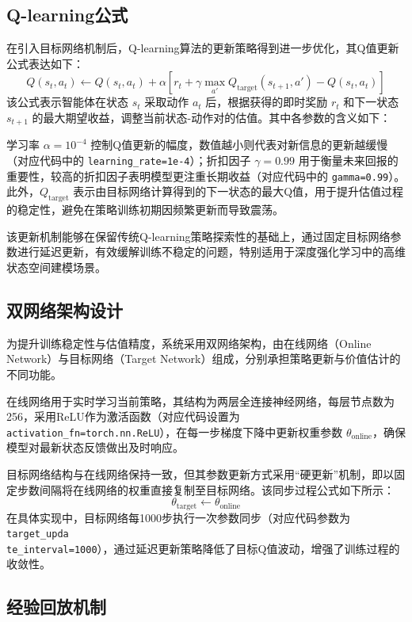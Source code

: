 \subsection{Q-learning公式}

在引入目标网络机制后，Q-learning算法的更新策略得到进一步优化，其Q值更新公式表达如下：
\[
Q(s_t,a_t) \leftarrow Q(s_t,a_t) + \alpha\left[r_t + \gamma \max_{a'}Q_{\text{target}}(s_{t+1},a') - Q(s_t,a_t)\right]
\]
该公式表示智能体在状态 $s_t$ 采取动作 $a_t$ 后，根据获得的即时奖励 $r_t$ 和下一状态 $s_{t+1}$ 的最大期望收益，调整当前状态-动作对的估值。其中各参数的含义如下：

学习率 $\alpha=10^{-4}$ 控制Q值更新的幅度，数值越小则代表对新信息的更新越缓慢（对应代码中的 \texttt{learning\_rate=1e-4}）；折扣因子 $\gamma=0.99$ 用于衡量未来回报的重要性，较高的折扣因子表明模型更注重长期收益（对应代码中的 \texttt{gamma=0.99}）。此外，$Q_{\text{target}}$ 表示由目标网络计算得到的下一状态的最大Q值，用于提升估值过程的稳定性，避免在策略训练初期因频繁更新而导致震荡。

该更新机制能够在保留传统Q-learning策略探索性的基础上，通过固定目标网络参数进行延迟更新，有效缓解训练不稳定的问题，特别适用于深度强化学习中的高维状态空间建模场景。

\subsection{双网络架构设计}

为提升训练稳定性与估值精度，系统采用双网络架构，由在线网络（Online Network）与目标网络（Target Network）组成，分别承担策略更新与价值估计的不同功能。

在线网络用于实时学习当前策略，其结构为两层全连接神经网络，每层节点数为256，采用ReLU作为激活函数（对应代码设置为 \texttt{activation\_fn=torch.nn.ReLU}），在每一步梯度下降中更新权重参数 $\theta_{\text{online}}$，确保模型对最新状态反馈做出及时响应。

目标网络结构与在线网络保持一致，但其参数更新方式采用“硬更新”机制，即以固定步数间隔将在线网络的权重直接复制至目标网络。该同步过程公式如下所示：
\[
\theta_{\text{target}} \leftarrow \theta_{\text{online}}
\]
在具体实现中，目标网络每1000步执行一次参数同步（对应代码参数为 \texttt{target\_upda\\te\_interval=1000}），通过延迟更新策略降低了目标Q值波动，增强了训练过程的收敛性。

\subsection{经验回放机制}

